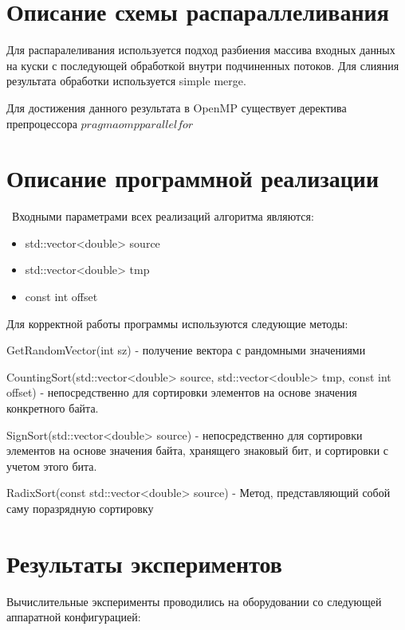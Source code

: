 \documentclass{report}
\begin{document}
    \newpage

    \section*{Описание схемы распараллеливания}
    Для распаралеливания используется подход разбиения массива входных данных на куски с последующей обработкой внутри подчиненных потоков. Для слияния результата обработки используется simple merge.
    \par Для достижения данного результата в OpenMP существует деректива препроцессора $pragma omp parallel for$
    \newpage

    \section*{Описание программной реализации}
    \
    Входными параметрами всех реализаций алгоритма являются:
    \begin{itemize}
        \item std::vector<double> source
        \item std::vector<double> tmp
        \item const int offset
    \end{itemize}

    \par Для корректной работы программы используются следующие методы:

    \par GetRandomVector(int sz) - получение вектора с рандомными значениями
    \par CountingSort(std::vector<double> source, std::vector<double> tmp, const int offset) - непосредственно для сортировки элементов на основе значения конкретного байта.
    \par SignSort(std::vector<double> source) - непосредственно для сортировки элементов на основе значения байта, хранящего знаковый бит, и сортировки с учетом этого бита.
    \par RadixSort(const std::vector<double> source) - Метод, представляющий собой саму поразрядную сортировку

    \newpage

    \section*{Результаты экспериментов}
    Вычислительные эксперименты проводились на оборудовании со следующей аппаратной конфигурацией:
\end{document}
